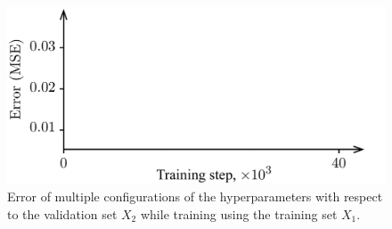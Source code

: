\begin{figure}
  \centering
  \includegraphics[width=1.0\columnwidth]{include/assets/figures/validation.pdf}
  \vspace{-1.5em}
  \caption{
    Error of multiple configurations of the hyperparameters with respect to the
    validation set $X_2$ while training using the training set $X_1$.
  }
  \vspace{-1.5em}
\end{figure}
